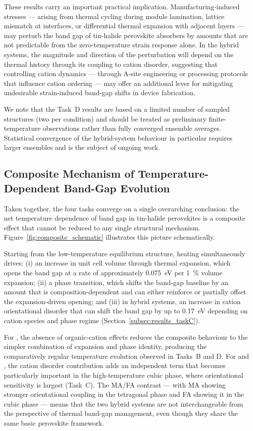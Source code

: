 These results carry an important practical implication.
Manufacturing-induced stresses --- arising from thermal cycling
during module lamination, lattice mismatch at interfaces, or
differential thermal expansion with adjacent layers --- may perturb
the band gap of tin-halide perovskite absorbers by amounts that are
not predictable from the zero-temperature strain response alone.
In the hybrid systems, the magnitude and direction of the
perturbation will depend on the thermal history through its coupling
to cation disorder, suggesting that controlling cation dynamics ---
through A-site engineering or processing protocols that influence
cation ordering --- may offer an additional lever for mitigating
undesirable strain-induced band-gap shifts in device fabrication.
\cite{yang2022strain}

We note that the Task~D results are based on a limited number of
sampled structures (two per condition) and should be treated as
preliminary finite-temperature observations rather than fully
converged ensemble averages.
Statistical convergence of the hybrid-system behaviour in particular
requires larger ensembles and is the subject of ongoing work.

\subsection{Composite Mechanism of Temperature-Dependent Band-Gap Evolution}
\label{subsec:composite}

Taken together, the four tasks converge on a single overarching
conclusion: the net temperature dependence of band gap in tin-halide
perovskites is a composite effect that cannot be reduced to any
single structural mechanism.
Figure~\ref{fig:composite_schematic} illustrates this picture
schematically.

Starting from the low-temperature equilibrium structure, heating
simultaneously drives:
(i) an increase in unit cell volume through thermal expansion,
which opens the band gap at a rate of approximately
\SI{0.075}{eV} per \SI{1}{\percent} volume expansion;
(ii) a phase transition, which shifts the band-gap baseline by an
amount that is composition-dependent and can either reinforce or
partially offset the expansion-driven opening; and
(iii) in hybrid systems, an increase in cation orientational
disorder that can shift the band gap by up to \SI{0.17}{eV}
depending on cation species and phase regime (Section~\ref{subsec:results_taskC}).

For \CsSnI{}, the absence of organic-cation effects reduces the
composite behaviour to the simpler combination of expansion and
phase identity, producing the comparatively regular temperature
evolution observed in Tasks~B and D.
For \FASnI{} and \MASnI{}, the cation disorder contribution adds
an independent term that becomes particularly important in the
high-temperature cubic phase, where orientational sensitivity is
largest (Task~C).
The MA/FA contrast --- with MA showing stronger orientational
coupling in the tetragonal phase and FA showing it in the cubic
phase --- means that the two hybrid systems are not interchangeable
from the perspective of thermal band-gap management, even though
they share the same basic perovskite framework.

